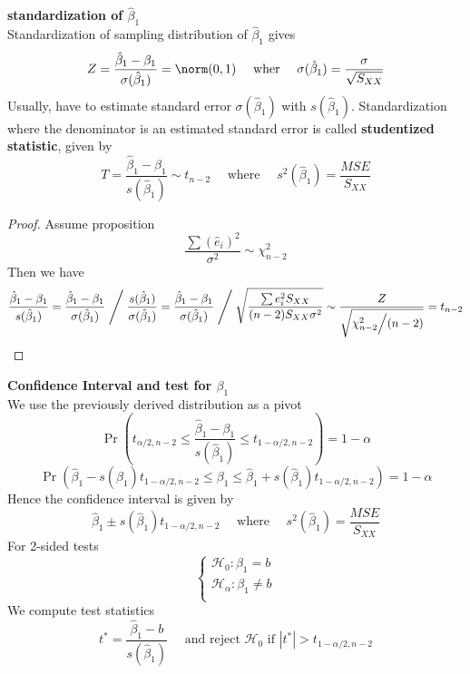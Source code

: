 \documentclass[11pt]{article}
\begin{document}
\begin{defn*}
	\textbf{standardization of $\hat{\beta}_1$} \\
	Standardization of sampling distribution of $\hat{\beta}_1$ gives 
	\[
		Z =  \frac{\hat{\beta}_1 - \beta_1}{\sigma(\hat{\beta}_1)} = \norm(0, 1) \quad \text{ wher } \quad \sigma(\hat{\beta}_1) = \frac{\sigma}{\sqrt{S_{XX}}}
	\]
	Usually, have to estimate standard error $\sigma(\hat{\beta}_1)$ with $s(\hat{\beta}_1)$. Standardization where the denominator is an estimated standard error is called \textbf{studentized statistic}, given by
	\[
		T = \frac{\hat{\beta}_1 - \beta_1}{s(\hat{\beta}_1)} \sim t_{n-2} \quad  \text{ where } \quad s^2(\hat{\beta}_1) = \frac{MSE}{S_{XX}}
	\]
	\begin{proof}
		Assume proposition 
		\[
			\frac{\sum (\hat{e}_i)^2 }{\sigma^2} \sim \chi^2_{n-2}
		\]
		Then we have 
		\[
			\frac{\hat{\beta}_1 - \beta_1}{s(\hat{\beta}_1)} 
			= \frac{\hat{\beta}_1 - \beta_1}{\sigma(\hat{\beta}_1)} \Biggm/ \frac{s(\hat{\beta}_1)}{\sigma(\hat{\beta}_1)} 
			= \frac{\hat{\beta}_1 - \beta_1}{\sigma(\hat{\beta}_1)} \Biggm/ \sqrt{\frac{\sum e_i^2 S_{XX}}{(n-2) S_{XX} \sigma^2 }}
			\sim \frac{Z}{\sqrt{\chi^2_{n-2} \Big/ (n-2)}} 
			= t_{n-2}
		\]
	\end{proof}
\end{defn*}


\begin{defn*}
	\textbf{Confidence Interval and test for $\beta_1$} \\
	We use the previously derived distribution as a pivot
	\[
		\Pr\left(t_{\alpha/2, n-2} \leq \frac{\hat{\beta}_1 - \beta_1}{s(\hat{\beta}_1)} \leq t_{1-\alpha/2, n-2}\right) = 1-\alpha
	\]
	\[
		\Pr\left(\hat{\beta}_1 - s(\hat{\beta}_1)t_{1-\alpha/2, n-2} \leq \beta_1 \leq \hat{\beta}_1 + s(\hat{\beta}_1)t_{1-\alpha/2, n-2} \right) = 1-\alpha
	\]
	Hence the confidence interval is given by 
	\[
		\hat{\beta}_1 \pm s(\hat{\beta}_1)t_{1-\alpha/2, n-2} \quad \text{ where }\quad s^2(\hat{\beta}_1) = \frac{MSE}{S_{XX}}
	\]
	For 2-sided tests
	\[
		\begin{cases*}
			\mathcal{H}_0: \beta_1 = b\\
			\mathcal{H}_{\alpha}: \beta_1 \neq b\\  
		\end{cases*}
	\]
	We compute test statistics 
	\[
		t^* = \frac{\hat{\beta}_1 - b}{s(\hat{\beta}_1)} \quad \text{ and reject $\mathcal{H}_0$ if }  |t^*| > t_{1-\alpha/2, n-2}
	\]
\end{defn*}
\end{document}
